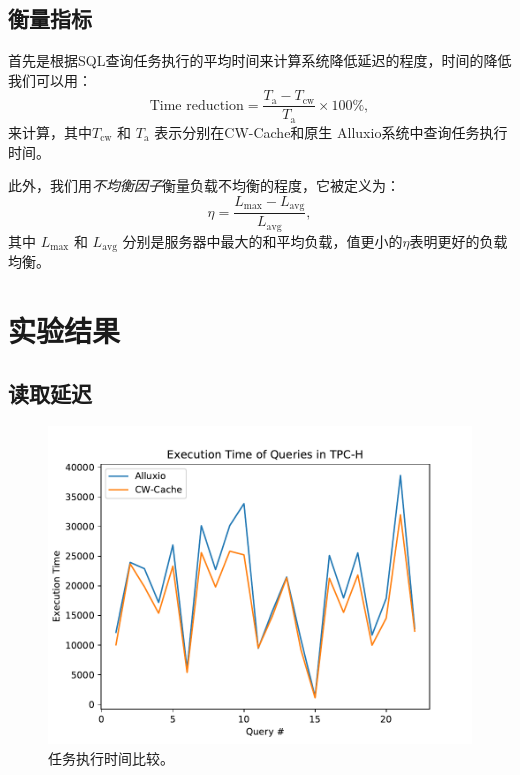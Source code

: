 \subsection{衡量指标}

\par 首先是根据SQL查询任务执行的平均时间来计算系统降低延迟的程度，时间的降低我们可以用：
\begin{equation}
    \textstyle \text{Time reduction} = \frac{T_\mathrm{a} - T_\mathrm{cw}}{T_\mathrm{a}} \times 100\%,
    \label{eq:time-reduce}
 \end{equation}
 来计算，其中$T_\mathrm{cw}$ 和 $T_\mathrm{a}$ 表示分别在CW-Cache和原生 Alluxio系统中查询任务执行时间。

\par 此外，我们用\emph{不均衡因子}衡量负载不均衡的程度，它被定义为：
\begin{equation}
    \textstyle \eta = \frac{L_{\mathrm{max}}-L_{\mathrm{avg}}}{L_{\mathrm{avg}}},
    \label{eq:ld-im}
\end{equation}
其中 $L_{\mathrm{max}}$ 和 $L_{\mathrm{avg}}$ 分别是服务器中最大的和平均负载，值更小的$\eta$表明更好的负载均衡。

\section{实验结果}

\subsection{读取延迟}

\begin{figure}[ht]
	\centering
	\includegraphics[width=0.70\paperwidth]{img/evaluation/query-execution-time}
	\caption{任务执行时间比较。}
	\label{fig:q-exe}
\end{figure}

